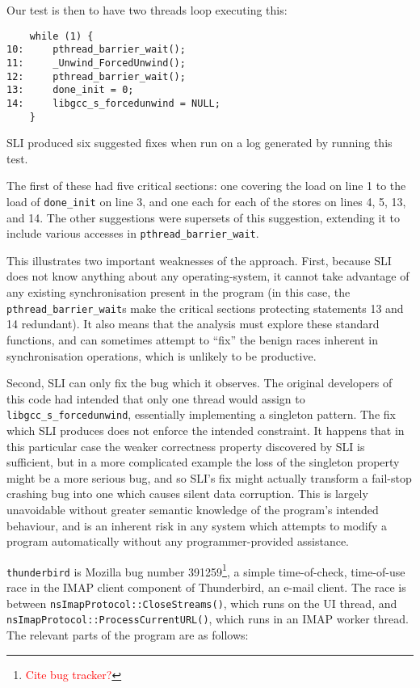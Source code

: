 \documentclass[10pt,twocolumn,preprint,natbib,authoryear]{sigplanconf}
\newcommand{\editorial}[1]{\textcolor{red}{\footnote{\textcolor{red}{#1}}}}
\begin{document}
Our test is then to have two threads loop executing this:

\begin{verbatim}
    while (1) {
10:     pthread_barrier_wait();
11:     _Unwind_ForcedUnwind();
12:     pthread_barrier_wait();
13:     done_init = 0;
14:     libgcc_s_forcedunwind = NULL;
    }
\end{verbatim}

SLI produced six suggested fixes when run on a log generated by
running this test.

The first of these had five critical sections: one covering the load
on line 1 to the load of \verb|done_init| on line 3, and one each for
each of the stores on lines 4, 5, 13, and 14.  The other suggestions
were supersets of this suggestion, extending it to include various
accesses in \verb|pthread_barrier_wait|.

This illustrates two important weaknesses of the approach.  First,
because SLI does not know anything about any operating-system, it
cannot take advantage of any existing synchronisation present in the
program (in this case, the \verb|pthread_barrier_wait|s make the
critical sections protecting statements 13 and 14 redundant).  It also
means that the analysis must explore these standard functions, and can
sometimes attempt to ``fix'' the benign races inherent in
synchronisation operations, which is unlikely to be productive.

Second, SLI can only fix the bug which it observes.  The original
developers of this code had intended that only one thread would assign
to \verb|libgcc_s_forcedunwind|, essentially implementing a singleton
pattern.  The fix which SLI produces does not enforce the intended
constraint.  It happens that in this particular case the weaker
correctness property discovered by SLI is sufficient, but in a more
complicated example the loss of the singleton property might be a more
serious bug, and so SLI's fix might actually transform a fail-stop
crashing bug into one which causes silent data corruption.  This is
largely unavoidable without greater semantic knowledge of the
program's intended behaviour, and is an inherent risk in any system
which attempts to modify a program automatically without any
programmer-provided assistance.

\verb|thunderbird| is Mozilla bug number 391259\editorial{Cite bug
  tracker?}, a simple time-of-check, time-of-use race in the IMAP
client component of Thunderbird, an e-mail client.  The race is
between \verb|nsImapProtocol::CloseStreams()|, which runs on the UI
thread, and \verb|nsImapProtocol::ProcessCurrentURL()|, which runs in
an IMAP worker thread.  The relevant parts of the program are as
follows:
\end{document}
